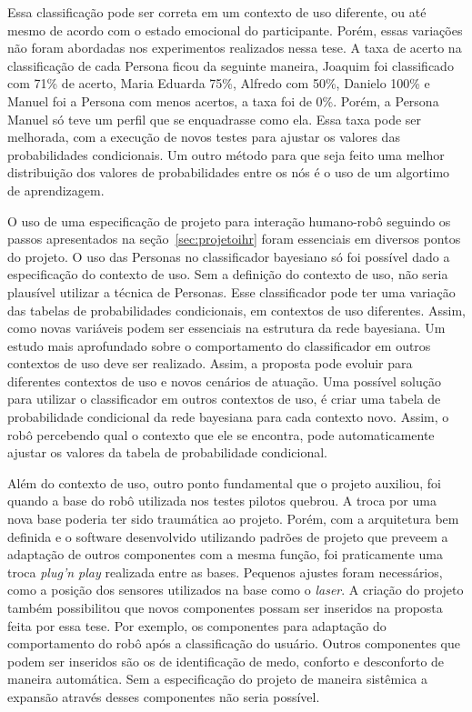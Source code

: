Essa classificação pode ser correta em um contexto de uso diferente, ou até mesmo de acordo com o estado emocional do participante. Porém, essas variações não foram abordadas nos experimentos realizados nessa tese. A taxa de acerto na classificação de cada Persona ficou da seguinte maneira, Joaquim foi classificado com 71\% de acerto, Maria Eduarda 75\%, Alfredo com 50\%, Danielo 100\% e Manuel foi a Persona com menos acertos, a taxa foi de 0\%. Porém, a Persona Manuel só teve um perfil que se enquadrasse como ela. Essa taxa pode ser melhorada, com a execução de novos testes para ajustar os valores das probabilidades condicionais. Um outro método para que seja feito uma melhor distribuição dos valores de probabilidades entre os nós é o uso de um algortimo de aprendizagem.

O uso de uma especificação de projeto para interação humano-robô seguindo os passos apresentados na seção~\ref{sec:projetoihr} foram essenciais em diversos pontos do projeto. O uso das Personas no classificador bayesiano só foi possível dado a especificação do contexto de uso. Sem a definição do contexto de uso, não seria plausível utilizar a técnica de Personas. Esse classificador pode ter uma variação das tabelas de probabilidades condicionais, em contextos de uso diferentes. Assim, como novas variáveis podem ser essenciais na estrutura da rede bayesiana. Um estudo mais aprofundado sobre o comportamento do classificador em outros contextos de uso deve ser realizado. Assim, a proposta pode evoluir para diferentes contextos de uso e novos cenários de atuação. Uma possível solução para utilizar o classificador em outros contextos de uso, é criar uma tabela de probabilidade condicional da rede bayesiana para cada contexto novo. Assim, o robô percebendo qual o contexto que ele se encontra, pode automaticamente ajustar os valores da tabela de probabilidade condicional.

Além do contexto de uso, outro ponto fundamental que o projeto auxiliou, foi quando a base do robô utilizada nos testes pilotos quebrou. A troca por uma nova base poderia ter sido traumática ao projeto. Porém, com a arquitetura bem definida e o software desenvolvido utilizando padrões de projeto que preveem a adaptação de outros componentes com a mesma função, foi praticamente uma troca \emph{plug'n play} realizada entre as bases. Pequenos ajustes foram necessários, como a posição dos sensores utilizados na base como o \emph{laser}. A criação do projeto também possibilitou que novos componentes possam ser inseridos na proposta feita por essa tese. Por exemplo, os componentes para adaptação do comportamento do robô após a classificação do usuário. Outros componentes que podem ser inseridos são os de identificação de medo, conforto e desconforto de maneira automática. Sem a especificação do projeto de maneira sistêmica a expansão através desses componentes não seria possível.

